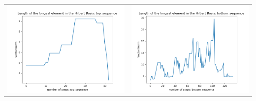 \documentclass[10pt]{article}
\begin{document}
\begin{tabular}{c|c}
\begin{minipage}{.45\textwidth}
\includegraphics[width=\textwidth]{"DATA/4d/5 generators 2 bound G/top_sequence LENGTH"}
\end{minipage} &
\begin{minipage}{.45\textwidth}
\includegraphics[width=\textwidth]{"DATA/4d/5 generators 2 bound G bottomup/bottom_sequence LENGTH"}
\end{minipage}
\end{tabular}
\end{document}
